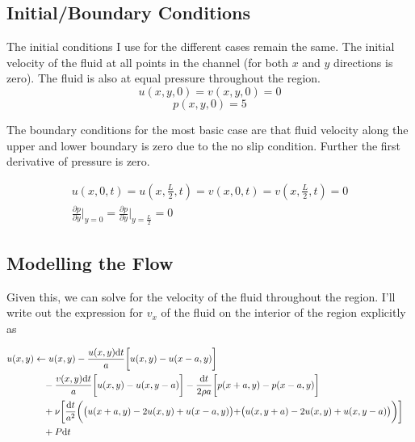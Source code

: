 \documentclass[11pt]{article}
\begin{document}
\subsection{Initial/Boundary
Conditions}\label{initialboundary-conditions}

The initial conditions I use for the different cases remain the same.
The initial velocity of the fluid at all points in the channel (for both
\(x\) and \(y\) directions is zero). The fluid is also at equal pressure
throughout the region. \[ u(x,y,0) = v(x,y,0) = 0\] \[p(x,y,0) = 5\]

The boundary conditions for the most basic case are that fluid velocity
along the upper and lower boundary is zero due to the no slip condition.
Further the first derivative of pressure is zero.

\begin{subequations}
\begin{align}
u(x,0,t) = u(x,\tfrac L2,t) = v(x,0,t) = v(x,\tfrac L2,t) = 0\\
\frac{\partial p}{\partial y} \biggr\vert_{y=0} = \frac{\partial p}{\partial y} \biggr\vert_{y=\frac{L}{2}} = 0
\end{align}
\end{subequations}

\subsection{Modelling the Flow}\label{modelling-the-flow}

Given this, we can solve for the velocity of the fluid throughout the
region. I'll write out the expression for \(v_x\) of the fluid on the
interior of the region explicitly as

\begin{align}
        \phantom{u(x,y)}
        &\begin{aligned}
          \mathllap{u(x,y)} &\leftarrow u(x,y) - \frac{u(x,y)\text{d}t}{a}\biggr[u(x,y)- u(x-a,y)\biggr]\\
          &\quad - \frac{v(x,y)\text{d}t}{a}\biggr[u(x,y) - u(x,y-a)\biggr]- \frac{\text{d}t}{2\rho a}\biggr[p(x+a,y) - p(x-a,y)\biggr]\\
            &\quad + \nu\biggr[\frac{\text{d}t}{a^2}\biggr(\bigr(u(x+a,y) - 2u(x,y) + u(x-a,y)\bigr) + \bigr(u(x,y+a) - 2u(x,y) + u(x,y-a)\bigr)\biggr)\biggr]\\
            &\quad + P\text{d}t\\
        \end{aligned}
\end{align}
\end{document}
